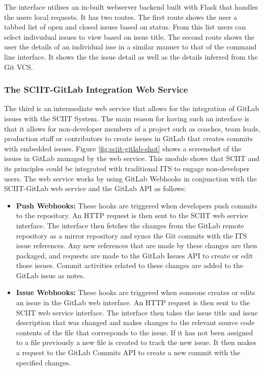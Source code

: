 \documentclass{mproj}
\begin{document}
The interface utilises an in-built webserver backend built with Flask that handles the users local requests. It has two routes. The first route shows the user a tabbed list of open and closed issues based on status. From this list users can select indivudual issues to view based on issue title. The second route shows the user the details of an individual isse in a similar manner to that of the command line interface. It shows the the issue detail as well as the details inferred from the Git VCS.

\subsubsection{The SCIIT-GitLab Integration Web Service}

The third is an intermediate web service that allows for the integration of GitLab issues with the SCIIT System. The main reason for having such an interface is that it allows for non-developer members of a project such as coaches, team leads, production staff or contributors to create issues in GitLab that creates commits with embedded issues. Figure \ref{fig:sciit-gitlab-shot} shows a screenshot of the issues in GitLab managed by the web service. This module shows that SCIIT and its principles could be integrated with traditional ITS to engage non-developer users. The web service works by using GitLab Webhooks in conjunction with the SCIIT-GitLab web service and the GitLab API as follows:

\begin{itemize}
  \item \textbf{Push Webhooks:} These hooks are triggered when developers push commits to the repository. An HTTP request is then sent to the SCIIT web service interface. The interface then fetches the changes from the GitLab remote repository as a mirror repository and syncs the Git commits with the ITS issue references. Any new references that are made by these changes are then packaged, and requests are made to the GitLab Issues API to create or edit those issues. Commit activities related to these changes are added to the GitLab issue as notes.
  \item \textbf{Issue Webhooks:} These hooks are triggered when someone creates or edits an issue in the GitLab web interface. An HTTP request is then sent to the SCIIT web service interface. The interface then takes the issue title and issue description that was changed and makes changes to the relevant source code contents of the file that corresponds to the issue. If it has not been assigned to a file previously a new file is created to track the new issue. It then makes a request to the GitLab Commits API to create a new commit with the specified changes.
\end{itemize}
\end{document}
